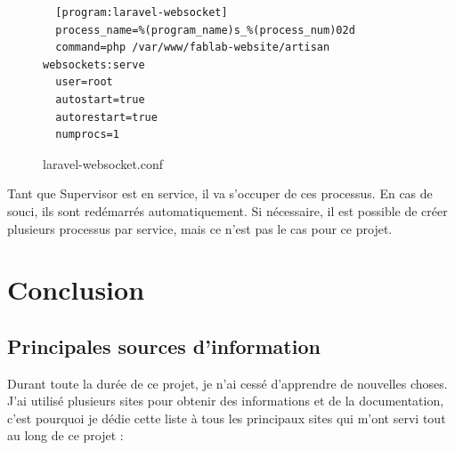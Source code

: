 \documentclass[
    iai, %
    eai, %
]{heig-tb}
\begin{document}
\begin{figure}[h]
  \begin{verbatim}
  [program:laravel-websocket]
  process_name=%(program_name)s_%(process_num)02d
  command=php /var/www/fablab-website/artisan websockets:serve
  user=root
  autostart=true
  autorestart=true
  numprocs=1
  \end{verbatim}
  \caption{laravel-websocket.conf}
\end{figure}

Tant que Supervisor est en service, il va s'occuper de ces processus. En cas de souci, ils sont redémarrés automatiquement. Si nécessaire, il est possible de créer plusieurs processus par service, mais ce n'est pas le cas pour ce projet.

\newpage
\chapter{Conclusion}

\section{Principales sources d'information}
Durant toute la durée de ce projet, je n'ai cessé d'apprendre de nouvelles choses. J'ai utilisé plusieurs sites pour obtenir des informations et de la documentation, c'est pourquoi je dédie cette liste à tous les principaux sites qui m'ont servi tout au long de ce projet :
\end{document}
